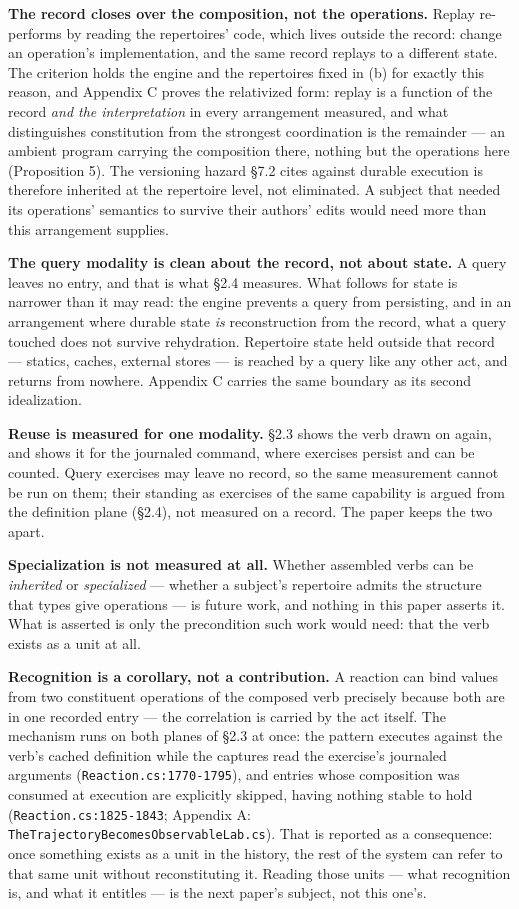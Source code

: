 \documentclass[
]{article}
\begin{document}
\textbf{The record closes over the composition, not the operations.}
Replay re-performs by reading the repertoires' code, which lives outside
the record: change an operation's implementation, and the same record
replays to a different state. The criterion holds the engine and the
repertoires fixed in (b) for exactly this reason, and Appendix C proves
the relativized form: replay is a function of the record \emph{and the
interpretation} in every arrangement measured, and what distinguishes
constitution from the strongest coordination is the remainder --- an
ambient program carrying the composition there, nothing but the
operations here (Proposition 5). The versioning hazard §7.2 cites
against durable execution is therefore inherited at the repertoire
level, not eliminated. A subject that needed its operations' semantics
to survive their authors' edits would need more than this arrangement
supplies.

\textbf{The query modality is clean about the record, not about state.}
A query leaves no entry, and that is what §2.4 measures. What follows
for state is narrower than it may read: the engine prevents a query from
persisting, and in an arrangement where durable state \emph{is}
reconstruction from the record, what a query touched does not survive
rehydration. Repertoire state held outside that record --- statics,
caches, external stores --- is reached by a query like any other act,
and returns from nowhere. Appendix C carries the same boundary as its
second idealization.

\textbf{Reuse is measured for one modality.} §2.3 shows the verb drawn
on again, and shows it for the journaled command, where exercises
persist and can be counted. Query exercises may leave no record, so the
same measurement cannot be run on them; their standing as exercises of
the same capability is argued from the definition plane (§2.4), not
measured on a record. The paper keeps the two apart.

\textbf{Specialization is not measured at all.} Whether assembled verbs
can be \emph{inherited} or \emph{specialized} --- whether a subject's
repertoire admits the structure that types give operations --- is future
work, and nothing in this paper asserts it. What is asserted is only the
precondition such work would need: that the verb exists as a unit at
all.

\textbf{Recognition is a corollary, not a contribution.} A reaction can
bind values from two constituent operations of the composed verb
precisely because both are in one recorded entry --- the correlation is
carried by the act itself. The mechanism runs on both planes of §2.3 at
once: the pattern executes against the verb's cached definition while
the captures read the exercise's journaled arguments
(\texttt{Reaction.cs:1770-1795}), and entries whose composition was
consumed at execution are explicitly skipped, having nothing stable to
hold (\texttt{Reaction.cs:1825-1843}; Appendix A:
\texttt{TheTrajectoryBecomesObservableLab.cs}). That is reported as a
consequence: once something exists as a unit in the history, the rest of
the system can refer to that same unit without reconstituting it.
Reading those units --- what recognition is, and what it entitles --- is
the next paper's subject, not this one's.
\end{document}
